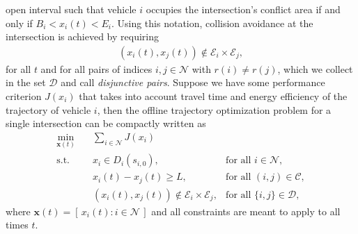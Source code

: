 \documentclass{article}
\theoremstyle{definition}
\theoremstyle{plain}
\begin{document}
open interval such that vehicle $i$ occupies the intersection's conflict area if
and only if $B_{i} < x_{i}(t) < E_{i}$. Using this notation, collision avoidance
at the intersection is achieved by requiring
\begin{align*}
  (x_{i}(t), x_{j}(t)) \notin \mathcal{E}_{i} \times \mathcal{E}_{j} ,
\end{align*}
for all $t$ and for all pairs of indices $i, j \in \mathcal{N}$ with
$r(i) \neq r(j)$, which we collect in the set $\mathcal{D}$ and call \textit{disjunctive
  pairs}.
%
Suppose we have some performance criterion $J(x_{i})$ that takes into account
travel time and energy efficiency of the trajectory of vehicle $i$, then the
offline trajectory optimization problem for a single intersection can be
compactly written as
\begin{equation}
\label{eq:offline_single_intersection}
\begin{aligned}
  \min_{\mathbf{x}(t)} \quad & \sum_{i \in \mathcal{N}} J(x_{i}) \\
  \text{s.t.} \quad  & x_{i} \in D_{i}(s_{i,0}) , &\text{for all } i \in \mathcal{N} , \\
                & x_{i}(t) - x_{j}(t) \geq L, &\text{for all } (i,j) \in \mathcal{C} , \\
                & (x_{i}(t), x_{j}(t))  \notin \mathcal{E}_{i} \times \mathcal{E}_{j} , &\text{for all } \{i,j\} \in \mathcal{D} ,
\end{aligned}
\end{equation}
where $\mathbf{x}(t) = [\, x_{i}(t) : i \in \mathcal{N} \,]$ and all constraints
are meant to apply to all times $t$.
\end{document}
